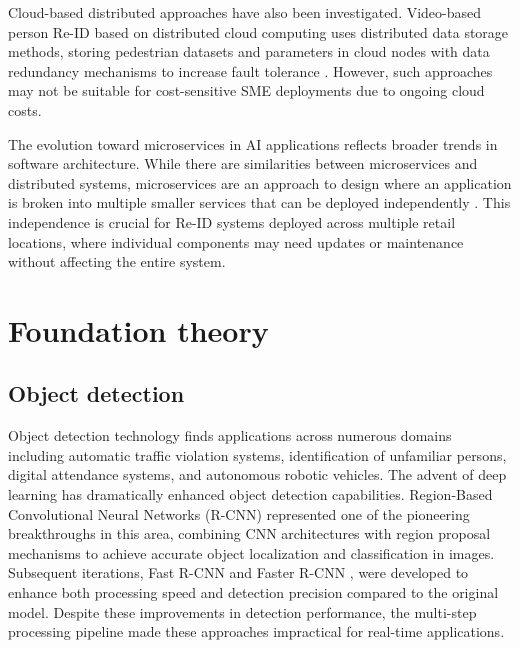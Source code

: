\documentclass[../main.tex]{subfiles}
\begin{document}
Cloud-based distributed approaches have also been investigated. Video-based person Re-ID based on distributed cloud computing uses distributed data storage methods, storing pedestrian datasets and parameters in cloud nodes with data redundancy mechanisms to increase fault tolerance \cite{jait2022_cloud}. However, such approaches may not be suitable for cost-sensitive SME deployments due to ongoing cloud costs.

The evolution toward microservices in AI applications reflects broader trends in software architecture. While there are similarities between microservices and distributed systems, microservices are an approach to design where an application is broken into multiple smaller services that can be deployed independently \cite{splunk2024}. This independence is crucial for Re-ID systems deployed across multiple retail locations, where individual components may need updates or maintenance without affecting the entire system.




\section{Foundation theory}
\label{sec:foundtheo}

\subsection{Object detection}
\label{sec:objdect}

Object detection technology finds applications across numerous domains including automatic traffic violation systems, identification of unfamiliar persons, digital attendance systems, and autonomous robotic vehicles. The advent of deep learning has dramatically enhanced object detection capabilities. Region-Based Convolutional Neural Networks (R-CNN) \cite{girshick2014richfeaturehierarchiesaccurate} represented one of the pioneering breakthroughs in this area, combining CNN architectures \cite{oshea2015introductionconvolutionalneuralnetworks} with region proposal mechanisms to achieve accurate object localization and classification in images. Subsequent iterations, Fast R-CNN \cite{girshick2015fastrcnn} and Faster R-CNN \cite{ren2016fasterrcnnrealtimeobject}, were developed to enhance both processing speed and detection precision compared to the original model. Despite these improvements in detection performance, the multi-step processing pipeline made these approaches impractical for real-time applications.
\end{document}
